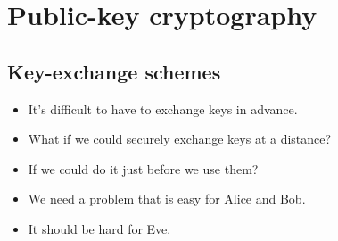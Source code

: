 \mode*




\section{Public-key cryptography}

\subsection{Key-exchange schemes}

\begin{frame}
  \begin{idea}
    \begin{itemize}
      \item It's difficult to have to exchange keys in advance.

        \pause{}

      \item What if we could securely exchange keys at a distance?
      \item If we could do it just before we use them?
    \end{itemize}
  \end{idea}

%
\end{frame}

\begin{frame}
  \begin{solution}[Requirements]
    \begin{itemize}
      \item We need a problem that is easy for Alice and Bob.
      \item It should be hard for Eve.
    \end{itemize}
  \end{solution}
\end{frame}

